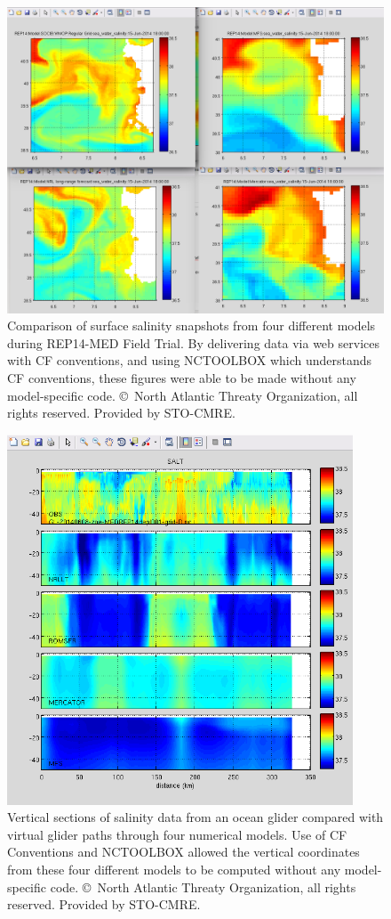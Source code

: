 \documentclass[osd, online, hvmath]{copernicus}
\begin{document}
\begin{figure}
\includegraphics[width=120mm]{os-2015-64-discussions-f03.png}
\caption{Comparison of surface salinity snapshots from four different
  models during REP14-MED Field Trial. By delivering data via web
  services with CF conventions, and using NCTOOLBOX which understands
  CF conventions, these figures were able to be made without any
  model-specific code.  \copyright~North Atlantic Threaty
  Organization, all rights reserved. Provided by STO-CMRE.}
\label{osd-2015-0064-f03.pdf}
\end{figure}

\begin{figure}
\includegraphics[height=110mm]{os-2015-64-discussions-f04.png}
\caption{Vertical sections of salinity data from an ocean glider
  compared with virtual glider paths through four numerical
  models. Use of CF Conventions and NCTOOLBOX allowed the vertical
  coordinates from these four different models to be computed without
  any model-specific code.  \copyright~North Atlantic Threaty
  Organization, all rights reserved. Provided by STO-CMRE.}
\label{osd-2015-0064-f04.pdf}
\end{figure}
\end{document}
